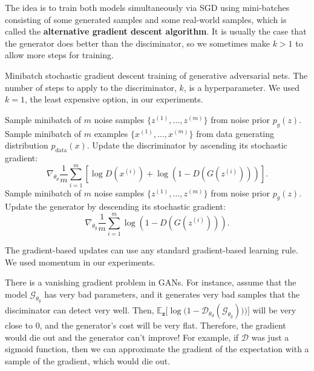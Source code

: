 \documentclass{article}
\begin{document}
  \begin{algo}
    The idea is to train both models simultaneously via SGD using mini-batches consisting of some generated samples and some real-world samples, which is called the \textbf{alternative gradient descent algorithm}. It is usually the case that the generator does better than the disciminator, so we sometimes make $k > 1$ to allow more steps for training. 
    \begin{algorithm}[H]
      \caption{Minibatch stochastic gradient descent training of generative adversarial nets. The number of steps to apply to the discriminator, $k$, is a hyperparameter. We used $k = 1$, the least expensive option, in our experiments.}
      \label{alg:alt_gd}
      \begin{algorithmic}[1] 
                \State Sample minibatch of $m$ noise samples $\{z^{(1)}, \ldots, z^{(m)}\}$ from noise prior $p_g(z)$.
                \State Sample minibatch of $m$ examples $\{x^{(1)}, \ldots, x^{(m)}\}$ from data generating distribution $p_{\text{data}}(x)$.
                \State Update the discriminator by ascending its stochastic gradient:
                \[
                    \nabla_{\theta_d} \frac{1}{m} \sum_{i=1}^m \left[\log D\left(x^{(i)}\right) + \log\left(1-D\left(G\left(z^{(i)}\right)\right)\right)\right].
                \]
            \EndFor
            \State Sample minibatch of $m$ noise samples $\{z^{(1)}, \ldots, z^{(m)}\}$ from noise prior $p_g(z)$.
            \State Update the generator by descending its stochastic gradient:
            \[
                \nabla_{\theta_g} \frac{1}{m} \sum_{i=1}^m \log\left(1-D\left(G\left(z^{(i)}\right)\right)\right).
            \]
        \EndFor
      \end{algorithmic}
    \end{algorithm}
    The gradient-based updates can use any standard gradient-based learning rule. We used momentum in our experiments.
  \end{algo} 

  There is a vanishing gradient problem in GANs. For instance, assume that the model $\mathcal{G}_{\theta_g}$ has very bad parameters, and it generates very bad samples that the disciminator can detect very well. Then, $\mathbb{E}_{\mathbf{z}} \big[ \log \big( 1 - \mathcal{D}_{\theta_d} (\mathcal{G}_{\theta_g}))\big) \big]$ will be very close to $0$, and the generator's cost will be very flat. Therefore, the gradient would die out and the generator can't improve! For example, if $\mathcal{D}$ was just a sigmoid function, then we can approximate the gradient of the expectation with a sample of the gradient, which would die out. 
\end{document}

